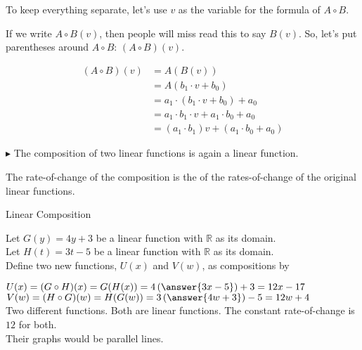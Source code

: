 \documentclass{ximera}
\begin{document}
To keep everything separate, let's use $v$ as the variable for the formula of $A \circ B$.



\begin{notation}
If we write $A \circ B(v)$, then people will miss read this to say $B(v)$.  So, let's put parentheses around $A \circ B$: $(A \circ B)(v)$.
\end{notation}






\begin{align*}
(A \circ B)(v) & = A(B(v)) \\
& = A(b_1 \cdot v + b_0)  \\
& = a_1 \cdot (b_1 \cdot v + b_0) + a_0  \\
& = a_1 \cdot b_1 \cdot v + a_1 \cdot b_0 + a_0    \\
& = (a_1 \cdot b_1) v + (a_1 \cdot b_0 + a_0)
\end{align*}






$\blacktriangleright$ The composition of two linear functions is again a linear function.


\begin{observation}
The rate-of-change of the composition is the  of the rates-of-change of the original linear functions.
\end{observation}




\begin{example} Linear Composition

Let $G(y) = 4 y + 3$ be a linear function with $\mathbb{R}$ as its domain. \\
Let $H(t) = 3 t -5$ be a linear function with $\mathbb{R}$ as its domain. \\


Define two new functions, $U(x)$ and $V(w)$, as compositions by

$U(x) = (G \circ H)(x) = G(H(x)) = 4 \left(\answer{3 x - 5}\right) + 3 = 12 x -17$ \\
$V(w) = (H \circ G)(w) =H(G(w)) = 3 \left(\answer{4 w + 3}\right) - 5 = 12 w + 4$ \\


Two different functions. Both are linear functions. The constant rate-of-change is $12$ for both. \\

Their graphs would be parallel lines. \\


\end{example}
\end{document}
